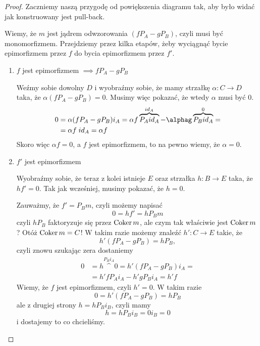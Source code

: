 \begin{proof}
  Zaczniemy naszą przygodę od powiększenia diagramu tak, aby było widać jak konstruowany jest pull-back.

  \begin{center}\end{center}
  Wiemy, że $m$ jest jądrem odwzorowania $(fP_A-gP_B)$, czyli musi być monomorfizmem. Przejdziemy przez kilka etapów, żeby wyciągnąć bycie epimorfizmem przez $f$ do bycia epimorfizmem przez $f'$.
  \begin{enumerate}
    \item $f$ jest epimorfizmem $\implies fP_A-gP_B$

      Weźmy sobie dowolny $D$ i wyobraźmy sobie, że mamy strzałkę $\alpha:C\to D$ taka, że $\alpha(fP_A-gP_B)=0$. Musimy więc pokazać, że wtedy $\alpha$ musi być $0$.
      \begin{align*}
        0 &= \alpha(fP_A-gP_B)i_A=\alpha f\overbrace{P_Aid_A}^{id_A}-\alphag\overbrace{P_Bid_A}^0=\\ 
          &=\alpha f\;id_A=\alpha f
      \end{align*}
      Skoro więc $\alpha f=0$, a $f$ jest epimorfizmem, to na pewno wiemy, że $\alpha=0$.
    \item $f'$ jest epimorfizmem

      Wyobraźmy sobie, że teraz z kolei istnieje $E$ oraz strzałka $h:B\to E$ taka, że $hf'=0$. Tak jak wcześniej, musimy pokazać, że $h=0$.

      Zauważmy, że $f'=P_Bm$, czyli możemy napisać
      $$0=hf'=hP_Bm$$
      czyli $hP_B$ faktoryzuje się przez $\operatorname{Coker} m$, ale czym tak właściwie jest $\operatorname{Coker} m$? Otóż $\operatorname{Coker} m=C$! W takim razie możemy znaleźć $h':C\to E$ takie, że
      $$h'(fP_A-gP_B)=hP_B,$$
      czyli znowu szukając zera dostaniemy
      \begin{align*}
        0&=h\overset{P_Bi_A}^{0}=h'(fP_A-gP_B)i_A=\\ 
         &=h'fP_Ai_A-h'gP_Bi_A=h'f
      \end{align*}
      Wiemy, że $f$ jest epimorfizmem, czyli $h'=0$. W takim razie
      $$0=h'(fP_A-gP_B)=hP_B$$
      ale z drugiej strony $h=hP_Bi_B$, czyli mamy
      $$h=hP_Bi_B=0i_B=0$$
      i dostajemy to co chcieliśmy.
  \end{enumerate}
\end{proof}

